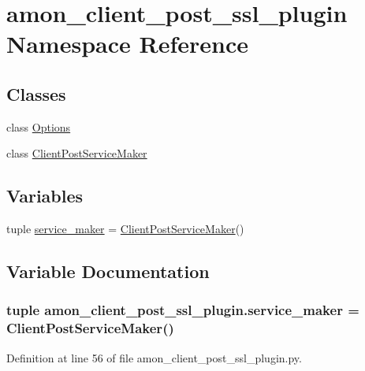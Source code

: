 \hypertarget{namespaceamon__client__post__ssl__plugin}{\section{amon\-\_\-client\-\_\-post\-\_\-ssl\-\_\-plugin Namespace Reference}
\label{namespaceamon__client__post__ssl__plugin}
}
\subsection*{Classes}
\begin{DoxyCompactItemize}
\item 
class \hyperlink{classamon__client__post__ssl__plugin_1_1_options}{Options}
\item 
class \hyperlink{classamon__client__post__ssl__plugin_1_1_client_post_service_maker}{Client\-Post\-Service\-Maker}
\end{DoxyCompactItemize}
\subsection*{Variables}
\begin{DoxyCompactItemize}
\item 
tuple \hyperlink{namespaceamon__client__post__ssl__plugin_a75412b32a76351d15331ad1d873670af}{service\-\_\-maker} = \hyperlink{classamon__client__post__ssl__plugin_1_1_client_post_service_maker}{Client\-Post\-Service\-Maker}()
\end{DoxyCompactItemize}


\subsection{Variable Documentation}
\hypertarget{namespaceamon__client__post__ssl__plugin_a75412b32a76351d15331ad1d873670af}{
\subsubsection[{service\-\_\-maker}]{\setlength{\rightskip}{0pt plus 5cm}tuple amon\-\_\-client\-\_\-post\-\_\-ssl\-\_\-plugin.\-service\-\_\-maker = {\bf Client\-Post\-Service\-Maker}()}}\label{namespaceamon__client__post__ssl__plugin_a75412b32a76351d15331ad1d873670af}


Definition at line 56 of file amon\-\_\-client\-\_\-post\-\_\-ssl\-\_\-plugin.\-py.

